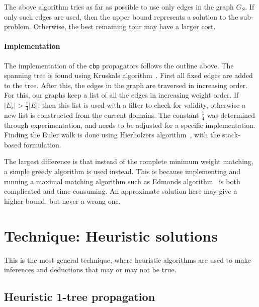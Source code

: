 \documentclass[runningheads]{llncs}
\newcommand{\cons}[1]{\texttt{#1}}
\begin{document}
The above algorithm tries as far as possible to use only edges in the
graph $G_S$. If only such edges are used, then the upper bound
represents a solution to the sub-problem. Otherwise, the best
remaining tour may have a larger cost.


\label{sec:christofides-impl}

\paragraph{Implementation} The implementation of the \cons{cbp} propagators follows the
outline above.
The spanning tree is found using Kruskals
algorithm~\cite{kruskal}. First all fixed edges are added to the
tree. After this, the edges in the graph are traversed in increasing
order. For this, our graphs keep a list of all the
edges in increasing weight order. If $|E_s|> \frac{1}{4}|E|$, then
this list is used with a filter to check for validity, otherwise a new
list is constructed from the current domains. The constant
$\frac{1}{4}$ was determined through experimentation, and needs to be
adjusted for a specific implementation.
Finding the Euler walk is done using Hierholzers
algorithm~\cite{hierholzer}, with the stack-based formulation.

The largest difference is that instead of the complete
minimum weight matching, a simple greedy algorithm is used
instead. This is because implementing and running a maximal matching
algorithm such as Edmonds algorithm~\cite{edmonds-matching} is both
complicated and time-consuming. An approximate solution here may give
a higher bound, but never a wrong one.


\section{Technique: Heuristic solutions}
\label{sec:hf-examples:solutions}

This is the most general technique, where heuristic algorithms are
used to make inferences and deductions that may or may not be true.

\subsection{Heuristic 1-tree propagation}
\label{sec:onetree}
\end{document}
